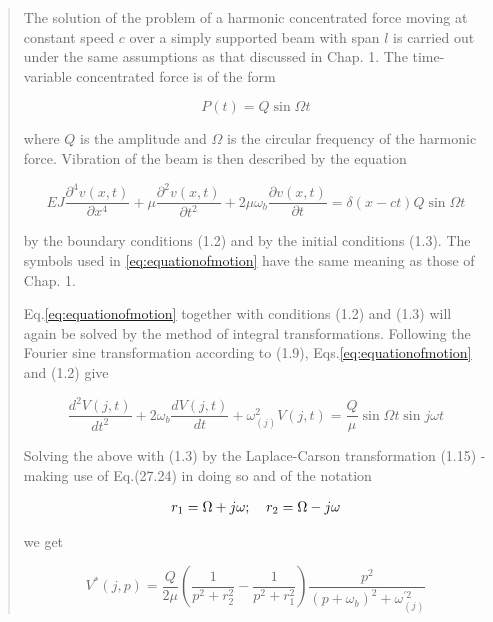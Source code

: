 \begin{quote}

The solution of the problem of a harmonic concentrated force moving at constant speed $c$ over a simply supported beam with span $l$ is carried out under the same assumptions as that discussed in Chap. 1. The time-variable concentrated force is of the form

\begin{equation}
    P(t) = Q \sin \Omega t
\end{equation}

where $Q$ is the amplitude and $\Omega$ is the circular frequency of the harmonic force. Vibration of the beam is then described by the equation

\begin{equation}\label{eq:equationofmotion}
    EJ\frac{\partial^4 v(x,t)}{\partial x^4} + \mu\frac{\partial^2 v(x,t)}{\partial t^2} +2\mu\omega_b \frac{\partial v(x,t)}{\partial t} = \delta(x-ct)Q\sin\Omega t 
\end{equation}

by the boundary conditions (1.2) and by the initial conditions (1.3). The symbols used in \ref{eq:equationofmotion} have the same meaning as those of Chap. 1.

Eq.\ref{eq:equationofmotion} together with conditions (1.2) and (1.3) will again be solved by the method of integral transformations. Following the Fourier sine transformation according to (1.9), Eqs.\ref{eq:equationofmotion} and (1.2) give

\begin{equation}
    \frac{d^2 V(j,t)}{d t^2} + 2\omega_b\frac{dV(j,t)}{dt} + \omega_{(j)}^2 V(j,t) = \frac{Q}{\mu} \sin\Omega t \sin j\omega t
\end{equation}

Solving the above with (1.3) by the Laplace-Carson transformation (1.15) - making use of Eq.(27.24) in doing so and of the notation

\begin{equation}
    \begin{tabular}{cc}
        $r_1 = \Omega + j\omega$; & $r_2 = \Omega - j\omega$ \\
    \end{tabular}
\end{equation}

we get

\begin{equation}\label{eq:V*}
    V^* (j,p) = \frac{Q}{2\mu} (\frac{1}{p^2+r_2^2}-\frac{1}{p^2+r_1^2})\frac{p^2}{(p+\omega_b)^2+\omega_{(j)}^{'2}}
\end{equation}


\end{quote}
